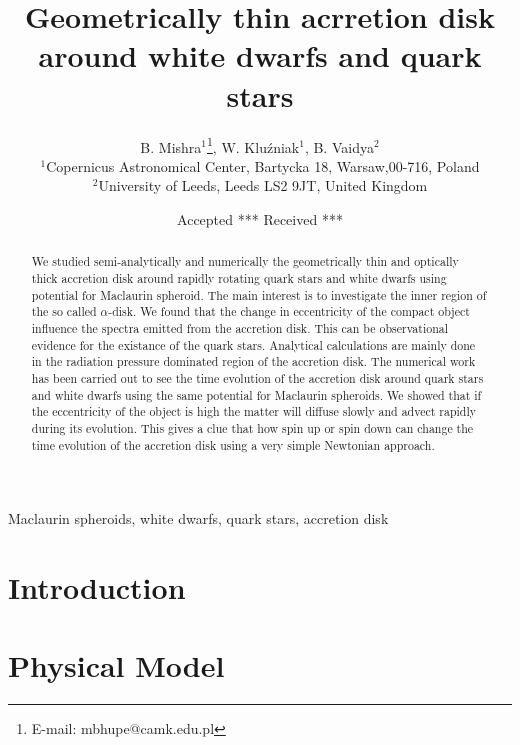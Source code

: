 \documentclass[useAMS,usenatbib]{mn2e}
\title[Geometrically thin acrretion disk around white dwarfs and quark stars]{Geometrically thin acrretion disk around white dwarfs and quark stars}
\author[B. Mishra, B. Vaidya and W. Kluzniak]{B. Mishra$^{1}$\thanks{E-mail:
mbhupe@camk.edu.pl}, W. Klu\'zniak$^{1}$, B. Vaidya$^{2}$\\
$^{1}$Copernicus Astronomical Center, Bartycka 18, Warsaw,00-716, Poland\\
$^{2}$University of Leeds, Leeds LS2 9JT, United Kingdom}
\begin{document}
\date{Accepted *** Received ***}

\pagerange{\pageref{firstpage}--\pageref{lastpage}} 

\maketitle

\label{firstpage}

\begin{abstract}
We studied semi-analytically and numerically the geometrically thin and optically thick accretion disk around rapidly rotating quark stars and white dwarfs using potential for Maclaurin spheroid. The main interest is to investigate the inner region of the so called $\alpha$-disk. We found that the change in eccentricity of the compact object influence the spectra emitted from the accretion disk. This can be observational evidence for the existance of the quark stars. Analytical calculations are mainly done in the radiation pressure dominated region of the accretion disk. The numerical work has been carried out to see the time evolution of the accretion disk around quark stars and white dwarfs using the same potential for Maclaurin spheroids. We showed that if the eccentricity of the object is high the matter will diffuse slowly and advect rapidly during its evolution. This gives a clue that how spin up or spin down can change the time evolution of the accretion disk using a very simple Newtonian approach.  

\end{abstract}

\begin{keywords}
Maclaurin spheroids, white dwarfs, quark stars, accretion disk
\end{keywords}

\section{Introduction}

\section{Physical Model}
\end{document}
